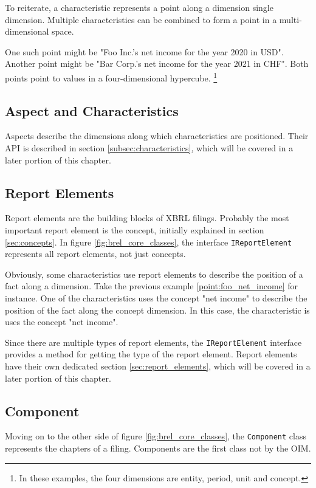 To reiterate, a characteristic represents a point along a dimension single dimension.
Multiple characteristics can be combined to form a point in a multi-dimensional space.

One such point might be "Foo Inc.'s net income for the year 2020 in USD".\label{point:foo_net_income}
Another point might be "Bar Corp.'s net income for the year 2021 in CHF".
Both points point to values in a four-dimensional hypercube.
\footnote{In these examples, the four dimensions are entity, period, unit and concept.}

\subsection{Aspect and Characteristics}

Aspects describe the dimensions along which characteristics are positioned.
Their API is described in section \ref{subsec:characteristics}, which will be covered in a later portion of this chapter.

\subsection{Report Elements}

Report elements are the building blocks of XBRL filings.
Probably the most important report element is the concept, initially explained in section \ref{sec:concepts}.
In figure \ref{fig:brel_core_classes}, the interface \texttt{IReportElement} represents all report elements, not just concepts.

Obviously, some characteristics use report elements to describe the position of a fact along a dimension.
Take the previous example \ref{point:foo_net_income} for instance.
One of the characteristics uses the concept "net income" to describe the position of the fact along the concept dimension.
In this case, the characteristic is uses the concept "net income". 

Since there are multiple types of report elements, the \texttt{IReportElement} interface provides a method for getting the type of the report element.
Report elements have their own dedicated section \ref{sec:report_elements}, which will be covered in a later portion of this chapter.

\subsection{Component}

Moving on to the other side of figure \ref{fig:brel_core_classes}, the \texttt{Component} class represents the chapters of a filing.
Components are the first class not by the OIM.

